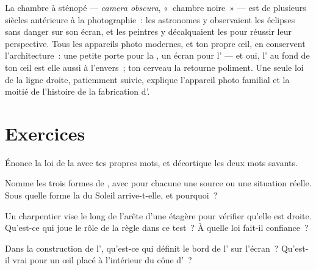 \begin{remark}\label{rem:g6:light-propagation:history}
La chambre à sténopé --- \emph{camera obscura}, «~chambre noire~» ---
est de plusieurs siècles antérieure à la photographie~: les
astronomes y observaient les éclipses sans danger sur son écran, et
les peintres y décalquaient les  pour réussir leur perspective.
Tous les appareils photo modernes, et ton propre œil, en conservent
l'architecture~: une petite porte pour la , un écran pour
l' --- et oui, l' au fond de ton œil est elle aussi à
l'envers~; ton cerveau la retourne poliment. Une seule loi de la
ligne droite, patiemment suivie, explique l'appareil photo familial
et la moitié de l'histoire de la fabrication d'.
\end{remark}

\section{Exercices}

\begin{exercise}[$\star$]\label{exo:g6:light-propagation:1}
Énonce la loi de la  avec tes propres mots, et
décortique les deux mots savants.
\end{exercise}

\begin{exercise}[$\star$]\label{exo:g6:light-propagation:2}
Nomme les trois formes de , avec pour chacune une source ou
une situation réelle. Sous quelle forme la  du Soleil
arrive-t-elle, et pourquoi~?
\end{exercise}

\begin{exercise}[$\star$]\label{exo:g6:light-propagation:3}
Un charpentier vise le long de l'arête d'une étagère pour vérifier
qu'elle est droite. Qu'est-ce qui joue le rôle de la règle dans ce
test~? À quelle loi fait-il confiance~?
\end{exercise}

\begin{exercise}[$\star$]\label{exo:g6:light-propagation:4}
Dans la construction de l', qu'est-ce qui définit le bord de
l' sur l'écran~? Qu'est-il vrai pour un œil placé à l'intérieur
du cône d'~?
\end{exercise}

